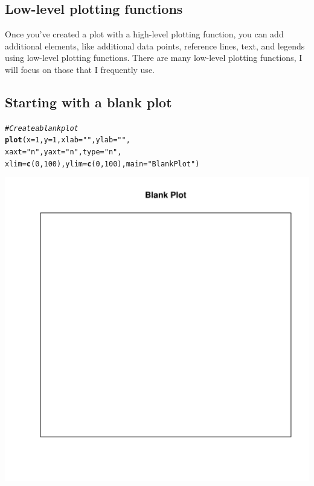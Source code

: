 \documentclass{tufte-book}\usepackage[]{graphicx}\usepackage[]{color}
\makeatletter
\def\maxwidth{ %
  \ifdim\Gin@nat@width>\linewidth
    \linewidth
  \else
    \Gin@nat@width
  \fi
}
\newcommand{\hlnum}[1]{\textcolor[rgb]{0.686,0.059,0.569}{#1}}%
\newcommand{\hlstr}[1]{\textcolor[rgb]{0.192,0.494,0.8}{#1}}%
\newcommand{\hlcom}[1]{\textcolor[rgb]{0.678,0.584,0.686}{\textit{#1}}}%
\newcommand{\hlstd}[1]{\textcolor[rgb]{0.345,0.345,0.345}{#1}}%
\newcommand{\hlkwc}[1]{\textcolor[rgb]{0.333,0.667,0.333}{#1}}%
\newcommand{\hlkwd}[1]{\textcolor[rgb]{0.737,0.353,0.396}{\textbf{#1}}}%
\newenvironment{kframe}{%
 \def\at@end@of@kframe{}%
 \ifinner\ifhmode%
  \def\at@end@of@kframe{\end{minipage}}%
  \begin{minipage}{\columnwidth}%
 \fi\fi%
 \def\FrameCommand##1{\hskip\@totalleftmargin \hskip-\fboxsep
 \colorbox{shadecolor}{##1}\hskip-\fboxsep
     \hskip-\linewidth \hskip-\@totalleftmargin \hskip\columnwidth}%
 \MakeFramed {\advance\hsize-\width
   \@totalleftmargin\z@ \linewidth\hsize
   \@setminipage}}%
 {\par\unskip\endMakeFramed%
 \at@end@of@kframe}
\newenvironment{knitrout}{}{} %
\makeatother
\begin{document}
\begin{footnotesize}
\section{Low-level plotting functions}

Once you've created a plot with a high-level plotting function, you can add additional elements, like additional data points, reference lines, text, and legends using low-level plotting functions. There are many low-level plotting functions, I will focus on those that I frequently use.

\subsection{Starting with a blank plot}


\begin{marginfigure}
\begin{tiny}
\begin{knitrout}
\color{fgcolor}\begin{kframe}
\begin{alltt}
\hlcom{# Create a blank plot}
\hlkwd{plot}\hlstd{(}\hlkwc{x} \hlstd{=} \hlnum{1}\hlstd{,} \hlkwc{y} \hlstd{=} \hlnum{1}\hlstd{,} \hlkwc{xlab} \hlstd{=} \hlstr{""}\hlstd{,} \hlkwc{ylab} \hlstd{=} \hlstr{""}\hlstd{,}
     \hlkwc{xaxt} \hlstd{=} \hlstr{"n"}\hlstd{,} \hlkwc{yaxt} \hlstd{=} \hlstr{"n"}\hlstd{,} \hlkwc{type} \hlstd{=} \hlstr{"n"}\hlstd{,}
     \hlkwc{xlim} \hlstd{=} \hlkwd{c}\hlstd{(}\hlnum{0}\hlstd{,} \hlnum{100}\hlstd{),} \hlkwc{ylim} \hlstd{=} \hlkwd{c}\hlstd{(}\hlnum{0}\hlstd{,} \hlnum{100}\hlstd{),} \hlkwc{main} \hlstd{=} \hlstr{"Blank Plot"}\hlstd{)}
\end{alltt}
\end{kframe}
\includegraphics[width=\maxwidth]{figure/unnamed-chunk-153-1} 


\end{knitrout}
\end{tiny}
\end{marginfigure}
\end{footnotesize}
\end{document}
